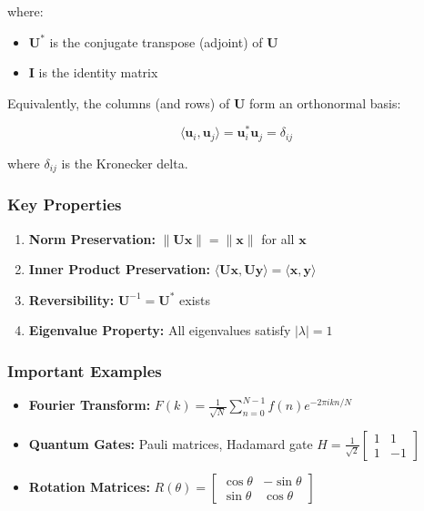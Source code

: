 where:
\begin{itemize}
	\item $\mathbf{U}^*$ is the conjugate transpose (adjoint) of $\mathbf{U}$
	\item $\mathbf{I}$ is the identity matrix
\end{itemize}

Equivalently, the columns (and rows) of $\mathbf{U}$ form an orthonormal basis:

\[
\langle \mathbf{u}_i, \mathbf{u}_j \rangle = \mathbf{u}_i^* \mathbf{u}_j = \delta_{ij}
\]

where $\delta_{ij}$ is the Kronecker delta.

\subsubsection*{Key Properties}

\begin{enumerate}
	\item \textbf{Norm Preservation:} $\|\mathbf{Ux}\| = \|\mathbf{x}\|$ for all $\mathbf{x}$
	\item \textbf{Inner Product Preservation:} $\langle \mathbf{Ux}, \mathbf{Uy} \rangle = \langle \mathbf{x}, \mathbf{y} \rangle$
	\item \textbf{Reversibility:} $\mathbf{U}^{-1} = \mathbf{U}^*$ exists
	\item \textbf{Eigenvalue Property:} All eigenvalues satisfy $|\lambda| = 1$
\end{enumerate}

\subsubsection*{Important Examples}

\begin{itemize}
	\item \textbf{Fourier Transform:} $F(k) = \frac{1}{\sqrt{N}} \sum_{n=0}^{N-1} f(n) e^{-2\pi i kn/N}$
	\item \textbf{Quantum Gates:} Pauli matrices, Hadamard gate $H = \frac{1}{\sqrt{2}} \begin{bmatrix} 1 & 1 \\ 1 & -1 \end{bmatrix}$
	\item \textbf{Rotation Matrices:} $R(\theta) = \begin{bmatrix} \cos\theta & -\sin\theta \\ \sin\theta & \cos\theta \end{bmatrix}$
\end{itemize}

